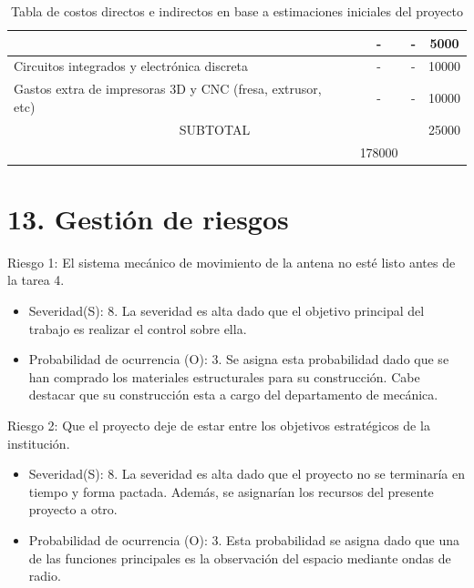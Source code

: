 \documentclass[11pt, %
codirector, %
]{charter}
\begin{document}
\begin{table}[htpb]
\begin{tabularx}{\linewidth}{@{}|X|c|r|r|@{}}
& \multicolumn{1}{c|}{-}
& \multicolumn{1}{c|}{-}
& \multicolumn{1}{c|}{5000}   \\ \hline
Circuitos integrados y electrónica discreta
& \multicolumn{1}{c|}{-}
& \multicolumn{1}{c|}{-}
& \multicolumn{1}{c|}{10000}   \\ \hline
Gastos extra de impresoras 3D y CNC (fresa, extrusor, etc)  
& \multicolumn{1}{c|}{-}
& \multicolumn{1}{c|}{-}
& \multicolumn{1}{c|}{10000}   \\ \hline
\multicolumn{3}{|c|}{SUBTOTAL} &
\multicolumn{1}{c|}{25000} \\ \hline 
\rowcolor[HTML]{C0C0C0} 
\multicolumn{3}{|c|}{TOTAL} &
\multicolumn{1}{c|}{178000} \\ \hline

%

\end{tabularx}%

\caption{Tabla de costos directos e indirectos en base a estimaciones iniciales del proyecto}
\end{table}


\section{13. Gestión de riesgos}
\label{sec:riesgos}

Riesgo 1: El sistema mecánico de movimiento de la antena no esté listo antes de la tarea 4.
\begin{itemize}
	\item Severidad(S): 8.\newline
		La severidad es alta dado que el objetivo principal del trabajo es realizar el control sobre ella.
	\item Probabilidad de ocurrencia (O): 3. \newline
	 Se asigna esta probabilidad dado que se han comprado los materiales estructurales para su construcción. Cabe destacar que su construcción esta a cargo del departamento de mecánica. 
\end{itemize}

Riesgo 2: Que el proyecto deje de estar entre los objetivos estratégicos de la institución.
\begin{itemize}
	\item Severidad(S): 8.\newline
	La severidad es alta dado que el proyecto no se terminaría en tiempo y forma pactada. Además, se asignarían los recursos del presente proyecto a otro. 
	\item Probabilidad de ocurrencia (O): 3. \newline
	Esta probabilidad se asigna dado que una de las funciones principales es la observación del espacio mediante ondas de radio.  
\end{itemize}
\end{document}
